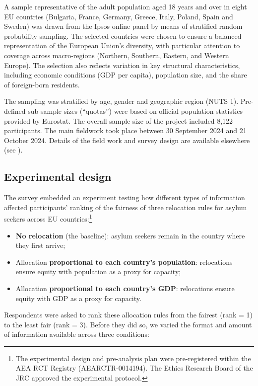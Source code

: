\documentclass[
  12pt,
  a4paper,
]{article}
\providecommand{\tightlist}{%
  \setlength{\itemsep}{0pt}\setlength{\parskip}{0pt}}
\begin{document}
A sample representative of the adult population aged 18 years and over in eight EU countries (Bulgaria, France, Germany, Greece, Italy, Poland, Spain and Sweden) was drawn from the Ipsos online panel by means of stratified random probability sampling. The selected countries were chosen to ensure a balanced representation of the European Union's diversity, with particular attention to coverage across macro-regions (Northern, Southern, Eastern, and Western Europe). The selection also reflects variation in key structural characteristics, including economic conditions (GDP per capita), population size, and the share of foreign-born residents.

The sampling was stratified by age, gender and geographic region (NUTS 1). Pre-defined sub-sample sizes (``quotas'') were based on official population statistics provided by Eurostat. The overall sample size of the project included 8,122 participants. The main fieldwork took place between 30 September 2024 and 21 October 2024. Details of the field work and survey design are available elsewhere (see ).

\subsection{Experimental design}\label{experimental-design}

The survey embedded an experiment testing how different types of information affected participants' ranking of the fairness of three relocation rules for asylum seekers across EU countries:\footnote{
  The experimental design and pre-analysis plan were pre-registered within the AEA RCT Registry (AEARCTR-0014194). The Ethics Research Board of the JRC approved the experimental protocol.}

\begin{itemize}
\tightlist
\item
  \textbf{No relocation} (the baseline): asylum seekers remain in the country where they first arrive;
\item
  Allocation \textbf{proportional to each country's population}: relocations ensure equity with population as a proxy for capacity;
\item
  Allocation \textbf{proportional to each country's GDP}: relocations ensure equity with GDP as a proxy for capacity.
\end{itemize}

Respondents were asked to rank these allocation rules from the fairest (rank = 1) to the least fair (rank = 3). Before they did so, we varied the format and amount of information available across three conditions:
\end{document}
